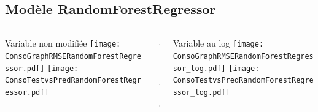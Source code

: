 \documentclass[8pt,aspectratio=169,hyperref={unicode=true}]{beamer}
\begin{document}
\subsection{Modèle RandomForestRegressor}
\begin{frame}{\insertsubsection}
  \begin{columns}[t]
    \begin{column}{.31\textwidth}
      \centering Variable non modifiée
      \texttt{[image: ConsoGraphRMSERandomForestRegressor.pdf]}
      \texttt{[image: ConsoTestvsPredRandomForestRegressor.pdf]}
    \end{column}
    \begin{column}{.38\textwidth}
      $\Longleftarrow$
      \scriptsize
      {\centering
        }
      

      \normalsize
      $\Longleftarrow$

      \raggedleft $\Longrightarrow$
      \scriptsize
      {\centering
        }
      

      \normalsize
      $\Longrightarrow$
    \end{column}
    \begin{column}{.31\textwidth}
      \centering Variable au log
      \texttt{[image: ConsoGraphRMSERandomForestRegressor\_log.pdf]}
      \texttt{[image: ConsoTestvsPredRandomForestRegressor\_log.pdf]}
    \end{column}
  \end{columns}
\end{frame}
\end{document}
